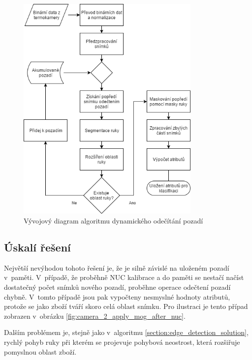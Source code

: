 \begin{figure}[h]
  \centering
  \includegraphics[width=0.8\textwidth]{images/mog_detection_diagram.png}
  \caption{Vývojový diagram algoritmu dynamického odečítání pozadí}
  \label{fig:mog_detection_diagram}
\end{figure} 

	\subsection{Úskalí řešení} \label{section:background_substract_problems}
    Největší nevýhodou tohoto řešení je, že je silně závislé na uloženém pozadí v~paměti. V~případě, že proběhně NUC kalibrace a do paměti se nestačí načíst dostatečný počet snímků nového pozadí, proběhne operace odečtení pozadí chybně. V~tomto případě jsou pak vypočteny nesmyslné hodnoty atributů, protože se jako zboží  tváří skoro celá oblast snímku. Pro ilustraci je tento případ zobrazen v~obrázku \ref{fig:camera_2_apply_mog_after_nuc}.
    
    Dalším problémem je, stejně jako v~algoritmu \ref{section:edge_detection_solution}, rychlý pohyb ruky při kterém se projevuje pohybová neostrost, která rozšiřuje pomyslnou oblast zboží.
    
